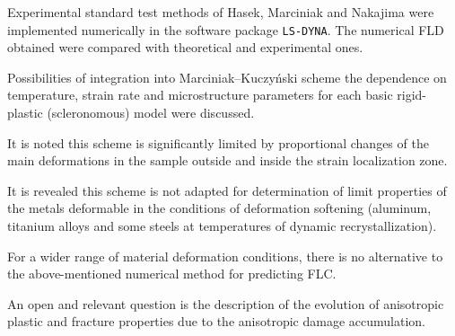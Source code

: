 {Experimental standard test methods of Hasek, Marciniak and Nakajima were implemented numerically in the software package {\tt LS-DYNA}. The numerical FLD obtained were compared with theoretical and experimental ones.



Possibilities of integration into Marciniak--Kuczy\'nski scheme the dependence on temperature, strain rate and microstructure parameters for each basic rigid-plastic (scleronomous) model were discussed.

It is noted this scheme is significantly limited by proportional changes of the main deformations in the sample outside and inside the strain localization zone.

It is revealed this scheme is not adapted for determination of limit properties of the metals deformable in the conditions of deformation softening (aluminum, titanium alloys and some steels at temperatures of dynamic recrystallization).

For a wider range of material deformation conditions, there is no alternative to the above-mentioned numerical method for predicting FLC.

An open and relevant question is the description of the evolution of anisotropic plastic and fracture properties due to the anisotropic damage accumulation.

}






\date{}








\renewcommand{\JournalDataOnline}{\displaydate{kellere}}





\makerutitle



